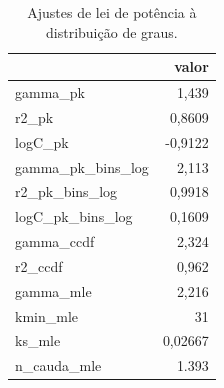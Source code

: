 \begin{table}[htbp]
\centering
\small
\caption{Ajustes de lei de potência à distribuição de graus.}
\label{tab:06_lei_potencia}
\begin{tabular}{lr}
\toprule
 & valor \\
\midrule
gamma\_pk & 1,439 \\
r2\_pk & 0,8609 \\
logC\_pk & -0,9122 \\
gamma\_pk\_bins\_log & 2,113 \\
r2\_pk\_bins\_log & 0,9918 \\
logC\_pk\_bins\_log & 0,1609 \\
gamma\_ccdf & 2,324 \\
r2\_ccdf & 0,962 \\
gamma\_mle & 2,216 \\
kmin\_mle & 31 \\
ks\_mle & 0,02667 \\
n\_cauda\_mle & 1.393 \\
\bottomrule
\end{tabular}
\end{table}
